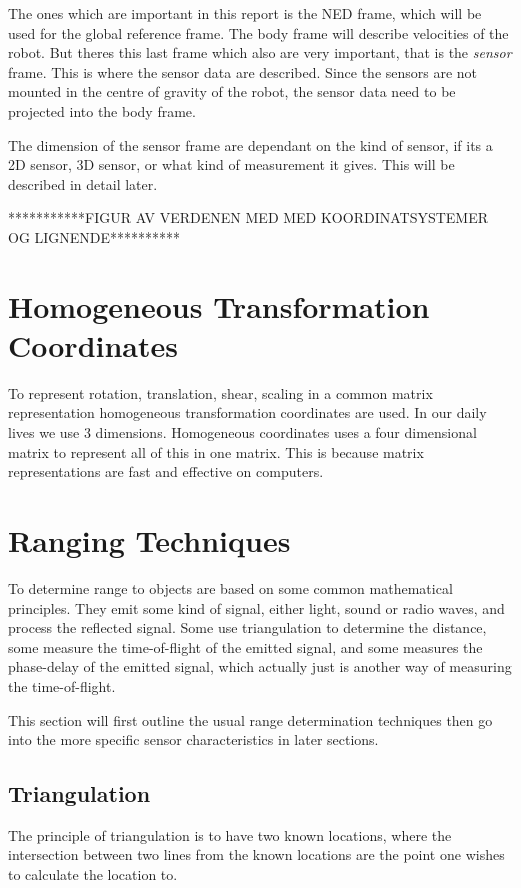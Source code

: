     The ones which are important in this report is the NED frame, which will be used for
    the global reference frame. The body frame will describe velocities of the robot. But
    theres this last frame which also are very important, that is the \emph{sensor} frame.
    This is where the sensor data are described. Since the sensors are not mounted in the
    centre of gravity of the robot, the sensor data need to be projected into the body
    frame. 

    The dimension of the sensor frame are dependant on the kind of sensor, if its a 2D
    sensor, 3D sensor, or what kind of measurement it gives. This will be described in
    detail later.

    ***********FIGUR AV VERDENEN MED MED KOORDINATSYSTEMER OG LIGNENDE**********
	
\section{Homogeneous Transformation Coordinates}
To represent rotation, translation, shear, scaling in a common matrix representation
homogeneous transformation coordinates are used. In our daily lives we use 3 dimensions.
Homogeneous coordinates uses a four dimensional matrix to represent all of this in one
matrix. This is because matrix representations are fast and effective on computers.



\section{Ranging Techniques}
To determine range to objects are based on some common mathematical principles. They emit
some kind of signal, either light, sound or radio waves, and process the reflected signal.
Some use triangulation to determine the distance, some measure the time-of-flight of the
emitted signal, and some measures the phase-delay of the emitted signal, which actually
just is another way of measuring the time-of-flight. 

This section will first outline the usual range determination techniques then go into the
more specific sensor characteristics in later sections. 


\subsection{Triangulation}
The principle of triangulation is to have two known locations, where the intersection
between two lines from the known locations are the point one wishes to calculate the
location to. 

